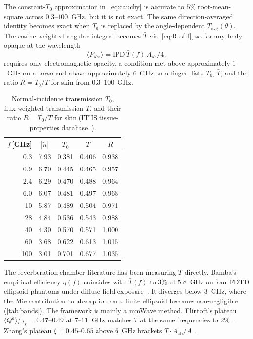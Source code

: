 \documentclass[journal,twocolumn,10pt]{IEEEtran}
\newcommand{\IPD}{\mathrm{IPD}}
\newcommand{\Aab}{A_{\mathrm{ab}}}
\newcommand{\Tavg}{T_{\mathrm{avg}}}
\newcommand{\Tbar}{\bar{T}}
\newcommand{\ntilde}{\tilde{n}}
\begin{document}
The constant-$T_0$ approximation in~\eqref{eq:cauchy} is accurate to
$5\%$ root-mean-square across $0.3$--$100$~GHz, but it is not
exact. The same direction-averaged identity becomes exact when $T_0$
is replaced by the angle-dependent $\Tavg(\theta)$. The
cosine-weighted angular integral becomes $\Tbar$
via~\eqref{eq:R-of-f}, so for any body opaque at the wavelength
\begin{equation}\label{eq:cauchy-exact}
  \langle P_{\mathrm{abs}} \rangle = \IPD\,\Tbar(f)\,\Aab/4 \,.
\end{equation}
 requires only electromagnetic opacity, a
condition met above approximately $1$~GHz on a torso and above
approximately $6$~GHz on a finger.  lists $T_0$,
$\Tbar$, and the ratio $R = T_0/\Tbar$ for skin from $0.3$--$100$~GHz.

\begin{table}[!t]
\centering
\caption{Normal-incidence transmission $T_0$, flux-weighted
transmission $\Tbar$, and their ratio $R = T_0/\Tbar$ for skin
(IT'IS tissue-properties database~\cite{ITISv5,Gabriel1996}).}\label{tab:Tbar}
\begin{tabular}{rcccc}
\toprule
$f$\,[GHz] & $|\ntilde|$ & $T_0$ & $\Tbar$ & $R$ \\
\midrule
0.3 & 7.93 & 0.381 & 0.406 & 0.938 \\
0.9 & 6.70 & 0.445 & 0.465 & 0.957 \\
2.4 & 6.29 & 0.470 & 0.488 & 0.964 \\
6.0 & 6.07 & 0.481 & 0.497 & 0.968 \\
10  & 5.87 & 0.489 & 0.504 & 0.971 \\
28  & 4.84 & 0.536 & 0.543 & 0.988 \\
40  & 4.30 & 0.570 & 0.571 & 1.000 \\
60  & 3.68 & 0.622 & 0.613 & 1.015 \\
100 & 3.01 & 0.701 & 0.677 & 1.035 \\
\bottomrule
\end{tabular}
\end{table}

The reverberation-chamber literature has been measuring $\Tbar$
directly. Bamba's empirical efficiency $\eta(f)$
coincides with $\Tbar(f)$ to $3\%$ at $5.8$~GHz on four FDTD ellipsoid
phantoms under diffuse-field exposure~\cite{Bamba2014}. It diverges below
$3$~GHz, where the Mie contribution to absorption on a finite
ellipsoid becomes non-negligible (\cref{tab:bands}). The framework
is mainly a mmWave method.
Flintoft's plateau $\langle Q^a\rangle/\gamma_s = 0.47$--$0.49$
at $7$--$11$~GHz matches $\Tbar$ at the same frequencies to $2\%$~\cite{Flintoft2014}.
Zhang's plateau $\xi = 0.45$--$0.65$ above $6$~GHz brackets
$\Tbar\cdot\Aab/A$~\cite{Zhang2017thesis}.
\end{document}

